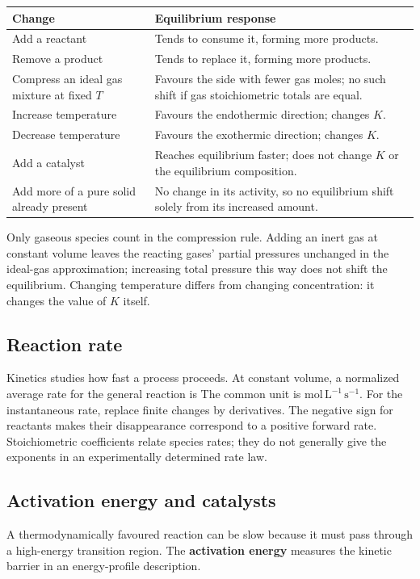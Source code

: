 \documentclass[a4paper,10pt]{article}
\begin{document}
\begin{tabularx}{\linewidth}{@{}P{43mm}L@{}}
\toprule
Change & Equilibrium response \\
\midrule
Add a reactant & Tends to consume it, forming more products. \\
Remove a product & Tends to replace it, forming more products. \\
Compress an ideal gas mixture at fixed $T$ & Favours the side with fewer gas
moles; no such shift if gas stoichiometric totals are equal. \\
Increase temperature & Favours the endothermic direction; changes $K$. \\
Decrease temperature & Favours the exothermic direction; changes $K$. \\
Add a catalyst & Reaches equilibrium faster; does not change $K$ or the
equilibrium composition. \\
Add more of a pure solid already present & No change in its activity, so no
equilibrium shift solely from its increased amount. \\
\bottomrule
\end{tabularx}

Only gaseous species count in the compression rule. Adding an inert gas at
constant volume leaves the reacting gases' partial pressures unchanged in the
ideal-gas approximation; increasing total pressure this way does not shift
the equilibrium. Changing temperature differs from changing concentration:
it changes the value of $K$ itself.

\subsection{Reaction rate}
Kinetics studies how fast a process proceeds. At constant volume, a normalized
average rate for the general reaction is
The common unit is $\mathrm{mol\,L^{-1}\,s^{-1}}$. For the instantaneous rate,
replace finite changes by derivatives. The negative sign for reactants makes
their disappearance correspond to a positive forward rate.
Stoichiometric coefficients relate species rates; they do not generally give
the exponents in an experimentally determined rate law.

\subsection{Activation energy and catalysts}
A thermodynamically favoured reaction can be slow because it must pass through
a high-energy transition region. The \textbf{activation energy} measures the
kinetic barrier in an energy-profile description.
\end{document}
